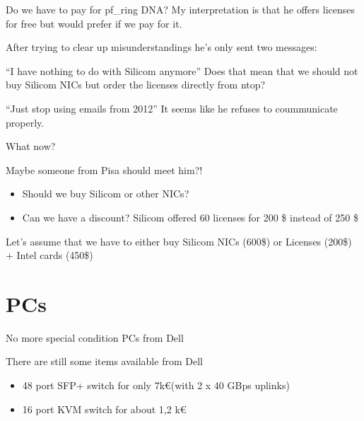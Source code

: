 \begin{frame}{Do we have to pay for pf_ring DNA?}{}
	My interpretation is that he offers licenses for free but would prefer if we
	pay for it.
	
	After trying to clear up misunderstandings he's only sent two messages:
	
	\begin{block}{``I have nothing to do with Silicom anymore''}
			Does that mean that we should not buy Silicom NICs but order the licenses
			directly from ntop?
	\end{block}
	
	\begin{block}{``Just stop using emails from 2012''}
		It seems like he refuses to	coummunicate properly. 
	\end{block}

\end{frame}

\begin{frame}{What now?}{}
	
	\begin{block}{Maybe someone from Pisa should meet him?!}
			\begin{itemize}
				\item Should we buy Silicom or other NICs?
				\item Can we have a discount? Silicom offered 60 licenses for 200 \$ instead
				of 250 \$
			\end{itemize}
	\end{block}
	
	\begin{ergo}
		Let's assume that we have to either buy Silicom NICs (600\$) or Licenses
		(200\$) + Intel cards (450\$)
\end{ergo}
\end{frame}


\section*{PCs}

\begin{frame}{No more special condition PCs from Dell}{}
	\begin{block}{There are still some items available from Dell}
		\begin{itemize}
		  	\item 48 port SFP+ switch for only 7k\euro (with 2 x 40 GBps uplinks) 			  	
  			\item 16 port KVM switch for about 1,2 k\euro
		\end{itemize}	
	\end{block}
	
\end{frame}

